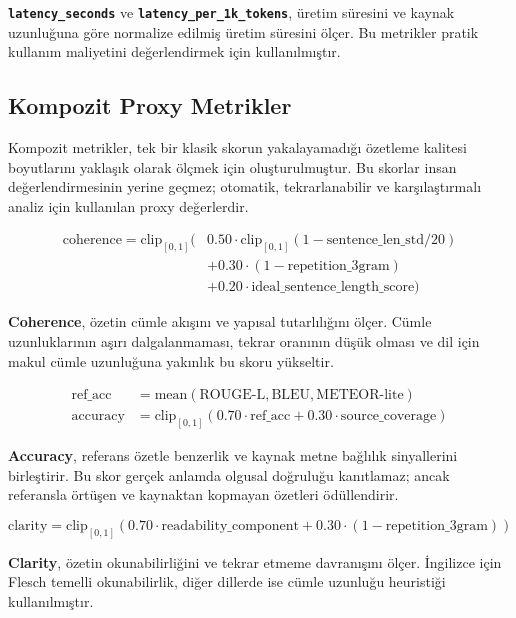 \documentclass[12pt,a4paper]{article}
\begin{document}
\textbf{\texttt{latency\_seconds}} ve \textbf{\texttt{latency\_per\_1k\_tokens}}, üretim süresini ve kaynak uzunluğuna göre normalize edilmiş üretim süresini ölçer. Bu metrikler pratik kullanım maliyetini değerlendirmek için kullanılmıştır.

\subsection{Kompozit Proxy Metrikler}

Kompozit metrikler, tek bir klasik skorun yakalayamadığı özetleme kalitesi boyutlarını yaklaşık olarak ölçmek için oluşturulmuştur. Bu skorlar insan değerlendirmesinin yerine geçmez; otomatik, tekrarlanabilir ve karşılaştırmalı analiz için kullanılan proxy değerlerdir.

\begin{align}
\text{coherence} = \text{clip}_{[0,1]}(&0.50 \cdot \text{clip}_{[0,1]}(1 - \text{sentence\_len\_std}/20) \nonumber\\
&+ 0.30 \cdot (1 - \text{repetition\_3gram}) \nonumber\\
&+ 0.20 \cdot \text{ideal\_sentence\_length\_score})
\end{align}

\textbf{Coherence}, özetin cümle akışını ve yapısal tutarlılığını ölçer. Cümle uzunluklarının aşırı dalgalanmaması, tekrar oranının düşük olması ve dil için makul cümle uzunluğuna yakınlık bu skoru yükseltir.

\begin{align}
\text{ref\_acc} &= \text{mean}(\text{ROUGE-L}, \text{BLEU}, \text{METEOR-lite})\\
\text{accuracy} &= \text{clip}_{[0,1]}(0.70 \cdot \text{ref\_acc} + 0.30 \cdot \text{source\_coverage})
\end{align}

\textbf{Accuracy}, referans özetle benzerlik ve kaynak metne bağlılık sinyallerini birleştirir. Bu skor gerçek anlamda olgusal doğruluğu kanıtlamaz; ancak referansla örtüşen ve kaynaktan kopmayan özetleri ödüllendirir.

\begin{equation}
\text{clarity} = \text{clip}_{[0,1]}(0.70 \cdot \text{readability\_component} + 0.30 \cdot (1 - \text{repetition\_3gram}))
\end{equation}

\textbf{Clarity}, özetin okunabilirliğini ve tekrar etmeme davranışını ölçer. İngilizce için Flesch temelli okunabilirlik, diğer dillerde ise cümle uzunluğu heuristiği kullanılmıştır.
\end{document}
